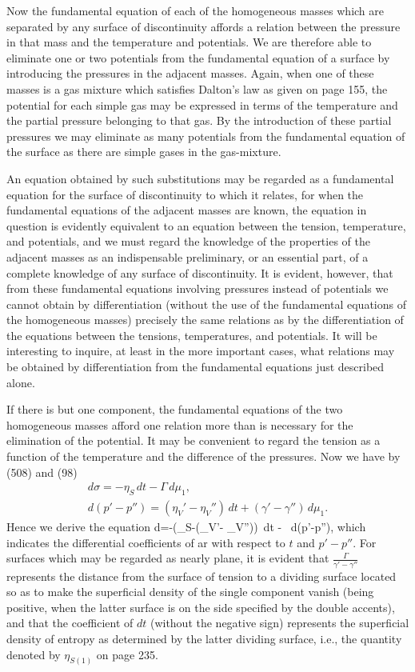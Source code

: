 \documentclass[12pt]{memoir}
\begin{document}
{Now the fundamental equation of each of the homogeneous masses which are separated by any surface of discontinuity affords a relation between the pressure in that mass and the temperature and potentials. We are therefore able to eliminate one or two potentials from the fundamental equation of a surface by introducing the pressures in the adjacent masses. Again, when one of these masses is a gas mixture which satisfies Dalton's law as given on page 155, the potential for each simple gas may be expressed in terms of the temperature and the partial pressure belonging to that gas. By the introduction of these partial pressures we may eliminate as many potentials from the fundamental equation of the surface as there are simple gases in the gas-mixture.

An equation obtained by such substitutions may be regarded as a fundamental equation for the surface of discontinuity to which it relates, for when the fundamental equations of the adjacent masses are known, the equation in question is evidently equivalent to an equation between the tension, temperature, and potentials, and we must regard the knowledge of the properties of the adjacent masses as an indispensable preliminary, or an essential part, of a complete knowledge of any surface of discontinuity. It is evident, however, that from these fundamental equations involving pressures instead of potentials we cannot obtain by differentiation (without the use of the fundamental equations of the homogeneous masses) precisely the same relations as by the differentiation of the equations between the tensions, temperatures, and potentials.  It will be interesting to inquire, at least in the more important cases, what relations may be obtained by differentiation from  the fundamental equations just described alone.

If there is but one component, the fundamental equations of the two homogeneous masses afford one relation more than is necessary for the elimination of the potential. It may be convenient to regard the tension as a function of the temperature and the difference of the pressures. Now we have by (508) and (98)
\begin{gather*}d\sigma = - \eta_S \, dt- \Gamma\, d\mu_1, \\
d(p'-p'')= (\eta_V'- \eta_V'')\, dt +(\gamma'- \gamma'')\, d\mu_1. \end{gather*}
Hence we derive the equation
\eqs d\sigma =-\left(\eta_S-(\eta_V'- \eta_V'')\right) \,dt -  \, d(p'-p''), \label{578} \eqe
which indicates the differential coefficients of ar with respect to $t$ and $p' -p''$. For surfaces which may be regarded as nearly plane, it is
evident that $\frac{\Gamma}{\gamma'-\gamma''}$ represents the distance from the surface of tension to a dividing surface located so as to make the superficial density of the single component vanish (being positive, when the latter surface is on the side specified by the double accents), and that the coefficient of $dt$ (without the negative sign) represents the superficial density of entropy as determined by the latter dividing surface, i.e., the quantity denoted by $\eta_{S(1)}$ on page 235.

}
\end{document}
